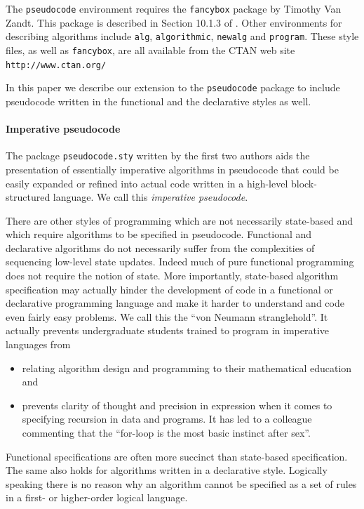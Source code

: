 \documentclass[a4]{article}
\newcommand{\keyword}[1]{\texttt{#1}}
\begin{document}
The \keyword{pseudocode} environment requires the \keyword{fancybox}
package by Timothy Van Zandt.  This package is described in 
Section 10.1.3 of \cite{LC}.
Other environments for describing algorithms include
\keyword{alg}, \keyword{algorithmic}, \keyword{newalg} and \keyword{program}.
These style files, as well as \keyword{fancybox}, are all available from the CTAN web site
\verb+http://www.ctan.org/+

In this paper we describe our extension to the \texttt{pseudocode}
package to include pseudocode written in the functional and the
declarative styles as well.

\paragraph{Imperative pseudocode} The package \texttt{pseudocode.sty}
written by the first two authors aids the presentation of essentially
imperative algorithms in pseudocode that could be easily expanded or
refined into actual code written in a high-level block-structured
language. We call this {\em imperative pseudocode}.

There are other styles of programming which are not necessarily state-based and which require algorithms to be
specified in pseudocode. Functional and declarative algorithms
do not necessarily suffer from the complexities of sequencing
low-level state updates. Indeed much of pure functional programming
does not require the notion of state. More importantly, state-based
algorithm specification may actually hinder the development of code in
a functional or declarative programming language and make it harder to
understand and code even fairly easy problems. We call this the ``von
Neumann stranglehold''. It actually prevents undergraduate students
trained to program in imperative languages from
\begin{itemize}
\item relating algorithm design and programming to their mathematical
  education and
\item prevents clarity of thought and precision in expression when it
  comes to specifying recursion in data and programs. It has led to a
  colleague commenting that the ``for-loop is the most basic instinct 
  after sex''.
\end{itemize}

Functional specifications are often more succinct than state-based
specification.  The same also holds for algorithms written in a
declarative style. Logically speaking there is no reason why an
algorithm cannot be specified as a set of rules in a first- or
higher-order logical language.
\end{document}
